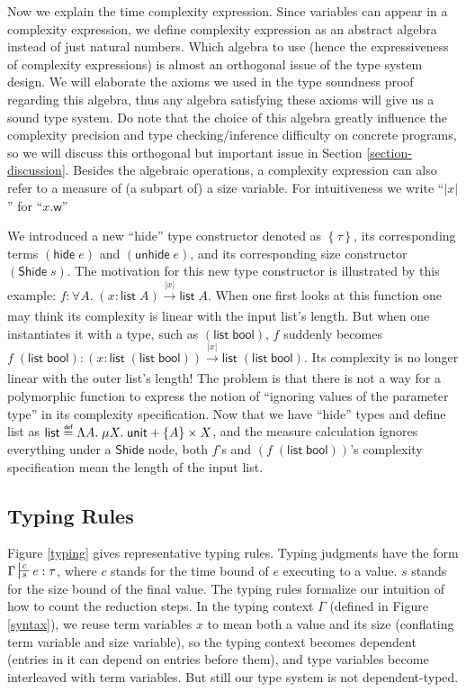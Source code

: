 \documentclass[preprint]{sigplanconf}
\newcommand{\thide}[1]{\left \{ #1 \right \}}
\newcommand{\typing}[4]{\turnstile{s}{s}{#4}{#3}{n}#1:#2}
\newcommand{\arrow}[4]{#1\xrightarrow[#3]{#2}#4}
\newcommand{\symhide}{\mathsf{hide\;}}
\newcommand{\symShide}{\mathsf{Shide}}
\newcommand{\symunhide}{\mathsf{unhide\;}}
\newcommand{\symunit}{\mathsf{unit}}
\newcommand{\symlist}{\mathsf{list}}
\newcommand{\symbool}{\mathsf{bool}}
\newcommand{\intro}[2]{(#1 : #2)}
\newcommand{\symwork}{\mathsf{w}}
\newcommand\defeq{\mathrel{\overset{\makebox[0pt]{\mbox{\normalfont\tiny\sffamily def}}}{=}}}
\begin{document}
Now we explain the time complexity expression. Since variables can appear in a complexity expression, we define complexity expression as an abstract algebra instead of just natural numbers. Which algebra to use (hence the expressiveness of complexity expressions) is almost an orthogonal issue of the type system design. We will elaborate the axioms we used in the type soundness proof regarding this algebra, thus any algebra satisfying these axioms will give us a sound type system. Do note that the choice of this algebra greatly influence the complexity precision and type checking/inference difficulty on concrete programs, so we will discuss this orthogonal but important issue in Section \ref{section-discussion}. Besides the algebraic operations, a complexity expression can also refer to a measure of (a subpart of) a size variable. For intuitiveness we write ``$|x|$'' for ``$x.\symwork$''

We introduced a new ``hide'' type constructor denoted as $\thide{\tau}$, its corresponding terms $(\symhide e)$ and $(\symunhide e)$, and its corresponding size constructor $(\symShide\;s)$. The motivation for this new type constructor is illustrated by this example: $f:\forall A.\;\arrow{\intro{x}{\symlist\;A}}{|x|}{}{\symlist\;A}$. When one first looks at this function one may think its complexity is linear with the input list's length. But when one instantiates it with a type, such as $(\symlist\;\symbool)$, $f$ suddenly becomes $f\;(\symlist\;\symbool):\arrow{\intro{x}{\symlist\;(\symlist\;\symbool)}}{|x|}{}{\symlist\;(\symlist\;\symbool)}$. Its complexity is no longer linear with the outer list's length! The problem is that there is not a way for a polymorphic function to express the notion of ``ignoring values of the parameter type'' in its complexity specification. Now that we have ``hide'' types and define list as $\symlist \defeq \Lambda A.\;\mu X.\;\symunit + \thide{A} \times X$, and the measure calculation ignores everything under a $\symShide$ node, both $f$'s and $(f\;(\symlist\;\symbool))$'s complexity specification mean the length of the input list.

\subsection{Typing Rules}

Figure \ref{typing} gives representative typing rules. Typing judgments have the form $\Gamma\typing{e}{\tau}{c}{s}$, where $c$ stands for the time bound of $e$ executing to a value. $s$ stands for the size bound of the final value. The typing rules formalize our intuition of how to count the reduction steps. In the typing context $\Gamma$ (defined in Figure \ref{syntax}), we reuse term variables $x$ to mean both a value and its size (conflating term variable and size variable), so the typing context becomes dependent (entries in it can depend on entries before them), and type variables become interleaved with term variables. But still our type system is not dependent-typed.
\end{document}
